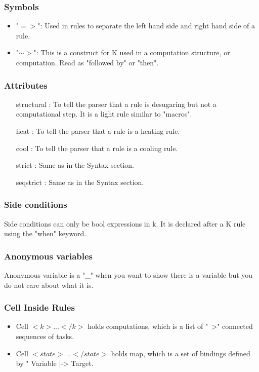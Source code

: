 \documentclass[a4paper]{article}
\begin{document}
\subsubsection{Symbols}
\begin{itemize}
    \item "$=>$": Used in rules to separate the left hand side and right hand side of a rule.
    \item "$\sim>$": This is a construct for K used in a computation structure, or computation. Read as "followed by" or "then". 
\end{itemize}
\subsubsection{Attributes}
\begin{itemize}
    \item [structural]: To tell the parser that a rule is desugaring but not a computational step. It is a light rule similar to "macros".
    \item [heat]: To tell the parser that a rule is a heating rule.
    \item [cool]: To tell the parser that a rule is a cooling rule.
    \item [strict]: Same as in the Syntax section.
    \item [seqstrict]: Same as in the Syntax section.
\end{itemize}
\subsubsection{Side conditions}
Side conditions can only be bool expressions in k. It is declared after a K rule using the "when" keyword.
\subsubsection{Anonymous variables}
Anonymous variable is a "\_" when you want to show there is a variable but you do not care about what it is.
\subsubsection{Cell Inside Rules}
\begin{itemize}
    \item Cell $<k>...</k>$ holds computations, which is a list of "~>" connected sequences of tasks.
    \item Cell $<state>...</state>$ holds map, which is a set of bindings defined by " Variable |-> Target.
\end{itemize}
\end{document}
